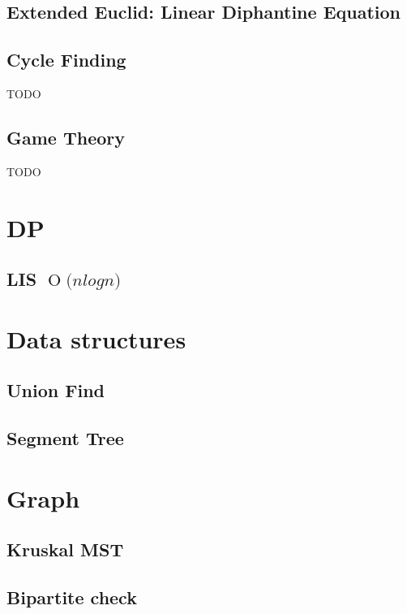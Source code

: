 \documentclass[twocolumn,8pt]{article}
\newcommand{\BigO}[1]{\ensuremath{\operatorname{O}\bigl(#1\bigr)}}
\begin{document}
\subsection{Extended Euclid: Linear Diphantine Equation}


\subsection{Cycle Finding}
TODO

\subsection{Game Theory}
TODO

\section{DP}

\subsection{LIS $\BigO{n log n}$}



\section{Data structures}

\subsection{Union Find}


\subsection{Segment Tree}



\section{Graph}

\subsection{Kruskal MST}


\subsection{Bipartite check}

\end{document}
